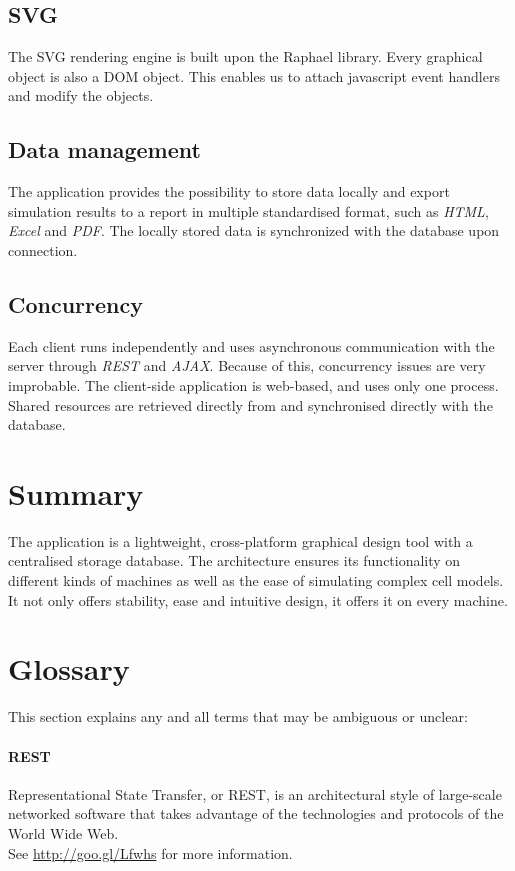 \documentclass{report}
\begin{document}
		\subsection{SVG}
			The SVG rendering engine is built upon the Raphael library. Every graphical object is also a DOM object. This enables us to attach javascript event handlers and modify the objects.
		\subsection{Data management}
			The application provides the possibility to store data locally and export simulation results to a report in multiple standardised format, such as \emph{HTML}, \emph{Excel} and \emph{PDF}.
			The locally stored data is synchronized with the database upon connection. 
		\subsection{Concurrency}
			Each client runs independently and uses asynchronous communication with the server through \emph{REST} and \emph{AJAX}. Because of this, concurrency issues are very improbable. The client-side application is web-based, and uses only one process. Shared resources are retrieved directly from and synchronised directly with the database.
	\clearpage
	\section{Summary}
		The application is a lightweight, cross-platform graphical design tool with a centralised storage database. The architecture ensures its functionality on different kinds of machines as well as the ease of simulating complex cell models. It not only offers stability, ease and intuitive design, it offers it on every machine.
	\section{Glossary}
		This section explains any and all terms that may be ambiguous or unclear:
		\paragraph{REST} 
			Representational State Transfer, or REST, is an architectural style of large-scale networked software that takes advantage of the technologies and protocols of the World Wide Web. \\
See \href{http://goo.gl/Lfwhs}{http://goo.gl/Lfwhs} for more information.
\end{document}
